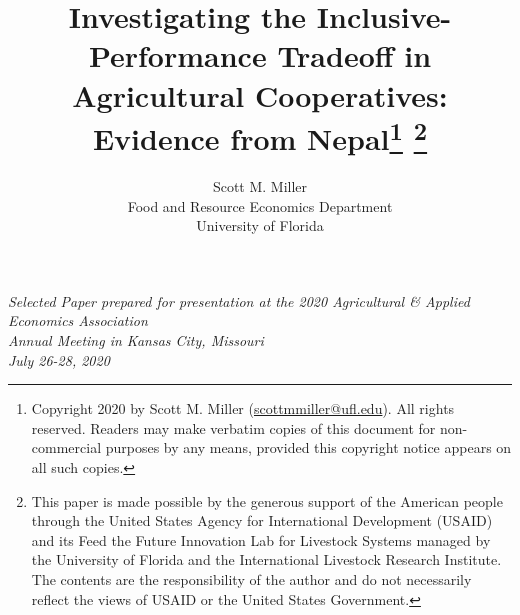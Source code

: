 \documentclass[11pt]{article}
\begin{document}



\title{Investigating the Inclusive-Performance Tradeoff in Agricultural Cooperatives: Evidence from Nepal\thanks{Copyright 2020 by Scott M. Miller (\href{scottmmiller@ufl.edu}{scottmmiller@ufl.edu}). All rights reserved. Readers may make verbatim copies of this document for non-commercial purposes by any means, provided this copyright notice appears on all such copies.} \thanks{This paper is made possible by the generous support of the American people through the United States Agency for International Development (USAID) and its Feed the Future Innovation Lab for Livestock Systems managed by the University of Florida and the International Livestock Research Institute. The contents are the responsibility of the author and do not necessarily reflect the views of USAID or the United States Government.}}


\author{Scott M. Miller \\ Food and Resource Economics Department \\ University of Florida}
\date{}

\sloppy
\maketitle

\vspace{2cm}
\begin{center}
\textit{Selected Paper prepared for presentation at the 2020 Agricultural \& Applied Economics Association \\ Annual Meeting in Kansas City, Missouri \\ July 26-28, 2020}  
\end{center}


\vspace{.5cm}

\end{document}
